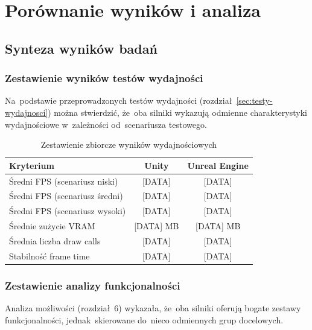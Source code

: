 
\clearpage
\section{Porównanie wyników i analiza}

\subsection{Synteza wyników badań}

\subsubsection{Zestawienie wyników testów wydajności}

Na~podstawie przeprowadzonych testów wydajności (rozdział~\ref{sec:testy-wydajnosci}) można stwierdzić, że~oba silniki wykazują odmienne charakterystyki wydajnościowe w~zależności od~scenariusza testowego.

\begin{table}[h!]
    \centering
    \caption{Zestawienie zbiorcze wyników wydajnościowych}
    \label{tab:performance-summary}
    \begin{tabular}{|l|c|c|}
        \hline
        \textbf{Kryterium} & \textbf{Unity} & \textbf{Unreal Engine} \\
        \hline\hline
        Średni FPS (scenariusz niski) & [DATA] & [DATA] \\
        \hline
        Średni FPS (scenariusz średni) & [DATA] & [DATA] \\
        \hline
        Średni FPS (scenariusz wysoki) & [DATA] & [DATA] \\
        \hline
        Średnie zużycie VRAM & [DATA] MB & [DATA] MB \\
        \hline
        Średnia liczba draw calls & [DATA] & [DATA] \\
        \hline
        Stabilność frame time & [DATA] & [DATA] \\
        \hline
    \end{tabular}
\end{table}

\subsubsection{Zestawienie analizy funkcjonalności}

Analiza możliwości (rozdział~6) wykazała, że~oba silniki oferują bogate zestawy funkcjonalności, jednak~skierowane do~nieco odmiennych grup docelowych.

